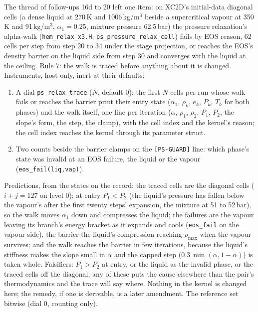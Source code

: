 \documentclass[11pt,a4paper]{article}
\newcommand{\code}[1]{\texttt{\small #1}}
\begin{document}
The thread of follow-ups 16d to 20 left one item: on XC2D's initial-data
diagonal cells (a dense liquid at 270\,K and 1006\,kg/m$^3$ beside a
supercritical vapour at 350\,K and 91\,kg/m$^3$, $\alpha_1 = 0.25$,
mixture pressure 62.5\,bar) the pressure relaxation's alpha-walk
(\code{hem\_relax\_x3.H}, \code{ps\_pressure\_relax\_cell}) fails by
EOS reason, 62 cells per step from step 20 to 34 under the stage
projection, or reaches the EOS's density barrier on the liquid side
from step 30 and converges with the liquid at the ceiling.  Rule 7:
the walk is traced before anything about it is changed.  Instruments,
host only, inert at their defaults:
\begin{enumerate}[nosep]
\item A dial \code{ps\_relax\_trace} ($N$, default 0): the first $N$
      cells per run whose walk fails or reaches the barrier print their
      entry state ($\alpha_1$, $\rho_k$, $e_k$, $P_k$, $T_k$ for both
      phases) and the walk itself, one line per iteration ($\alpha$,
      $\rho_1$, $\rho_2$, $P_1$, $P_2$, the slope's form, the step, the
      clamp), with the cell index and the kernel's reason; the cell
      index reaches the kernel through its parameter struct.
\item Two counts beside the barrier clamps on the \code{[PS-GUARD]}
      line: which phase's state was invalid at an EOS failure, the
      liquid or the vapour (\code{eos\_fail(liq,vap)}).
\end{enumerate}
Predictions, from the states on the record: the traced cells are the
diagonal cells ($i + j = 127$ on level 0); at entry $P_1 < P_2$ (the
liquid's pressure has fallen below the vapour's after the first twenty
steps' expansion, the mixture at 51 to 52\,bar), so the walk moves
$\alpha_1$ down and compresses the liquid; the failures are the vapour
leaving its branch's energy bracket as it expands and cools
(\code{eos\_fail} on the vapour side), the barrier the liquid's
compression reaching $\rho_{\max}$ when the vapour survives; and the
walk reaches the barrier in few iterations, because the liquid's
stiffness makes the slope small in $\alpha$ and the capped step
($0.3\,\min(\alpha, 1-\alpha)$) is taken whole.  Falsifiers: $P_1 > P_2$
at entry, or the liquid as the invalid phase, or the traced cells off
the diagonal; any of these puts the cause elsewhere than the pair's
thermodynamics and the trace will say where.  Nothing in the kernel is
changed here; the remedy, if one is derivable, is a later amendment.
The reference set bitwise (dial 0, counting only).
\end{document}
